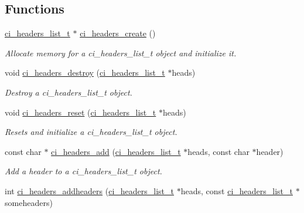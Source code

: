 \subsection*{Functions}
\begin{DoxyCompactItemize}
\item 
\hyperlink{group__HEADERS_gaaa203ac92dd0242ab66f4237548d7260}{ci\_\-headers\_\-list\_\-t} $\ast$ \hyperlink{group__HEADERS_ga7c5cc5d09bd83eb7ecc882ed200e6096}{ci\_\-headers\_\-create} ()
\begin{DoxyCompactList}\small\item\em Allocate memory for a ci\_\-headers\_\-list\_\-t object and initialize it. \item\end{DoxyCompactList}\item 
void \hyperlink{group__HEADERS_ga3196c0d95e2dff1af839d657a83c1788}{ci\_\-headers\_\-destroy} (\hyperlink{group__HEADERS_gaaa203ac92dd0242ab66f4237548d7260}{ci\_\-headers\_\-list\_\-t} $\ast$heads)
\begin{DoxyCompactList}\small\item\em Destroy a ci\_\-headers\_\-list\_\-t object. \item\end{DoxyCompactList}\item 
void \hyperlink{group__HEADERS_gac72053f066dd9ae607bc41b80a37d708}{ci\_\-headers\_\-reset} (\hyperlink{group__HEADERS_gaaa203ac92dd0242ab66f4237548d7260}{ci\_\-headers\_\-list\_\-t} $\ast$heads)
\begin{DoxyCompactList}\small\item\em Resets and initialize a ci\_\-headers\_\-list\_\-t object. \item\end{DoxyCompactList}\item 
const char $\ast$ \hyperlink{group__HEADERS_gac2762a25d8931a4accdef1be4bd57217}{ci\_\-headers\_\-add} (\hyperlink{group__HEADERS_gaaa203ac92dd0242ab66f4237548d7260}{ci\_\-headers\_\-list\_\-t} $\ast$heads, const char $\ast$header)
\begin{DoxyCompactList}\small\item\em Add a header to a ci\_\-headers\_\-list\_\-t object. \item\end{DoxyCompactList}\item 
int \hyperlink{group__HEADERS_ga58800a415a86551d22329c8049390b11}{ci\_\-headers\_\-addheaders} (\hyperlink{group__HEADERS_gaaa203ac92dd0242ab66f4237548d7260}{ci\_\-headers\_\-list\_\-t} $\ast$heads, const \hyperlink{group__HEADERS_gaaa203ac92dd0242ab66f4237548d7260}{ci\_\-headers\_\-list\_\-t} $\ast$someheaders)

\end{DoxyCompactItemize}
